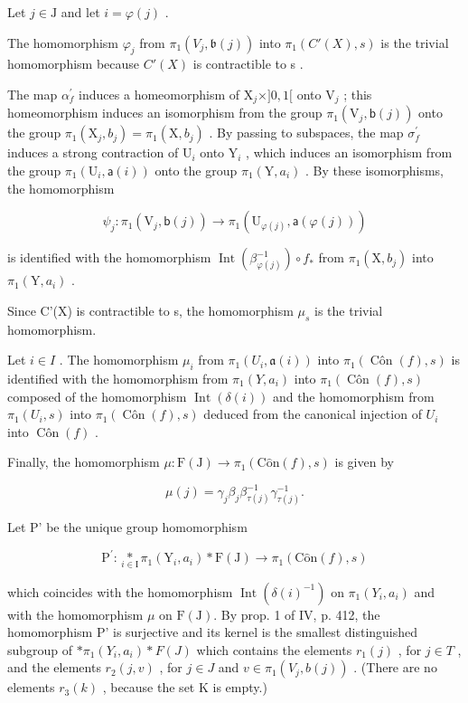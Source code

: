 Let \(j \in \mathrm{J}\) and let \(i = \varphi(j)\) .

The homomorphism \(\varphi_{j}\) from \(\pi_1(V_j, \mathfrak{b}(j))\) into \(\pi_1(C'(X), s)\) is the trivial homomorphism because \(C'(X)\) is contractible to s .

The map \(\alpha_{f}^{\prime}\) induces a homeomorphism of \(\mathrm{X}_{j} \times ]0,1[\) onto \(\mathrm{V}_{j}\) ; this homeomorphism induces an isomorphism from the group \(\pi_{1}(\mathrm{V}_{j},\mathsf{b}(j))\) onto the group \(\pi_{1}(\mathrm{X}_{j},b_{j}) = \pi_{1}(\mathrm{X},b_{j})\) . By passing to subspaces, the map \(\sigma_{f}^{\prime}\) induces a strong contraction of \(\mathrm{U}_{i}\) onto \(\mathrm{Y}_{i}\) , which induces an isomorphism from the group \(\pi_{1}(\mathrm{U}_{i},\mathsf{a}(i))\) onto the group \(\pi_{1}(\mathrm{Y},a_{i})\) . By these isomorphisms, the homomorphism

\[
\psi_ {j} \colon \pi_ {1} (\mathrm{V} _ {j}, \mathsf {b} (j)) \to \pi_ {1} (\mathrm{U} _ {\varphi (j)}, \mathsf {a} (\varphi (j)))
\]

is identified with the homomorphism \(\operatorname{Int}(\beta_{\varphi(j)}^{-1}) \circ f_*\) from \(\pi_1(\mathrm{X}, b_j)\) into \(\pi_1(\mathrm{Y}, a_i)\) .

Since C'(X) is contractible to s, the homomorphism \(\mu_{s}\) is the trivial homomorphism.

Let \(i \in I\) . The homomorphism \(\mu_i\) from \(\pi_1(U_i, \mathfrak{a}(i))\) into \(\pi_1(\operatorname{Côn}(f), s)\) is identified with the homomorphism from \(\pi_1(Y, a_i)\) into \(\pi_1(\operatorname{Côn}(f), s)\) composed of the homomorphism \(\operatorname{Int}(\delta(i))\) and the homomorphism from \(\pi_1(U_i, s)\) into \(\pi_1(\operatorname{Côn}(f), s)\) deduced from the canonical injection of \(U_i\) into \(\operatorname{Côn}(f) \) .

Finally, the homomorphism \(\mu\colon\mathrm{F}(\mathrm{J})\to\pi_{1}(\mathrm{C}\hat{\mathrm{o}}\mathrm{n}(f),s)\) is given by

\[
\mu (j) = \gamma_ {j} \beta_ {j} \beta_ {\tau (j)} ^ {- 1} \gamma_ {\tau (j)} ^ {- 1}.
\]

Let P' be the unique group homomorphism

\[
\mathrm{P} ^ {\prime} \colon \underset {i \in \mathrm{I}} {*} \pi_ {1} (\mathrm{Y} _ {i}, a _ {i}) * \mathrm{F} (\mathrm{J}) \to \pi_ {1} (\mathrm{C} \hat {\mathrm{o}} \mathrm{n} (f), s)
\]

which coincides with the homomorphism \(\operatorname{Int}(\delta(i)^{-1})\) on \(\pi_1(Y_i, a_i)\) and with the homomorphism \(\mu\) on \(\mathrm{F}(\mathrm{J})\). By prop. 1 of IV, p. 412, the homomorphism P' is surjective and its kernel is the smallest distinguished subgroup of \(*\pi_1(Y_i, a_i) * F(J)\) which contains the elements \(r_1(j)\) , for \(j \in T\) , and the elements \(r_{2}(j, v)\) , for \(j \in J\) and \(v \in \pi_{1}(V_{j}, b(j))\) . (There are no elements \(r_{3}(k)\) , because the set K is empty.)


